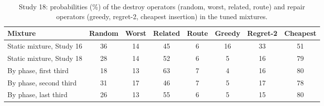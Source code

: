 \begin{table}[t]
\caption{Study 18: probabilities (\%) of the destroy operators (random, worst, related, route) and repair operators (greedy, regret-2, cheapest insertion) in the tuned mixtures.}\label{tab:s18w}
\centering
\small
\begin{adjustbox}{max width=\linewidth}
\begin{tabular}{lccccccc}
\toprule
Mixture & Random & Worst & Related & Route & Greedy & Regret-2 & Cheapest \\
\midrule
Static mixture, Study 16 & 36 & 14 & 45 & 6 & 16 & 33 & 51 \\
Static mixture, Study 18 & 28 & 14 & 52 & 6 & 5 & 16 & 79 \\
By phase, first third & 18 & 13 & 63 & 7 & 4 & 16 & 80 \\
By phase, second third & 31 & 17 & 46 & 7 & 5 & 17 & 78 \\
By phase, last third & 26 & 13 & 55 & 6 & 5 & 15 & 80 \\
\bottomrule
\end{tabular}
\end{adjustbox}
\end{table}
